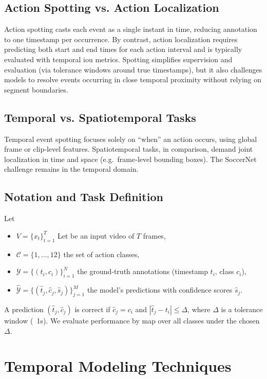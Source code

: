 \subsection{Action Spotting vs. Action Localization}
Action spotting casts each event as a single instant in time, reducing annotation to one timestamp per occurrence. By contrast, action localization requires predicting both start and end times for each action interval and is typically evaluated with temporal \acrfull{iou} metrics. Spotting simplifies supervision and evaluation (via tolerance windows around true timestamps), but it also challenges models to resolve events occurring in close temporal proximity without relying on segment boundaries.

\subsection{Temporal vs. Spatiotemporal Tasks}
Temporal event spotting focuses solely on “when” an action occurs, using global frame or clip‐level features. Spatiotemporal tasks, in comparison, demand joint localization in time and space (e.g.\ frame‐level bounding boxes). The SoccerNet challenge remains in the temporal domain. 

\subsection{Notation and Task Definition}
Let
\begin{itemize}
    \item \(V = \{x_t\}_{t=1}^T\) Let be an input video of \(T\) frames,  
    \item \(\mathcal{C} = \{1,\dots,12\}\) the set of action classes,  
    \item \(\mathcal{Y} = \{(t_i,c_i)\}_{i=1}^N\) the ground‐truth annotations (timestamp \(t_i\), class \(c_i\)),  
    \item \(\hat{\mathcal{Y}} = \{(\hat t_j,\hat c_j,\hat s_j)\}_{j=1}^M\) the model’s predictions with confidence scores \(\hat s_j\).  
\end{itemize}
A prediction \((\hat t_j,\hat c_j)\) is correct if \(\hat c_j=c_i\) and \(|\hat t_j - t_i|\le\Delta\), where \(\Delta\) is a tolerance window (\ 1s). We evaluate performance by \acrfull{map} over all classes under the chosen \(\Delta\).  


\section{Temporal Modeling Techniques}
\label{sec:temporal_models}


